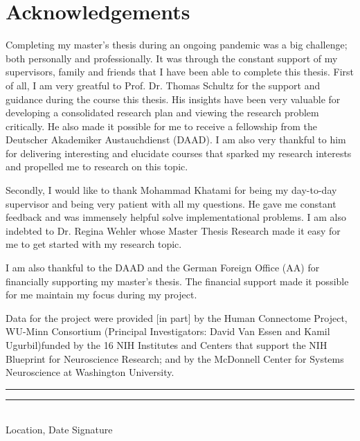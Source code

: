 
\chapter{Acknowledgements}
\thispagestyle{empty}
\noindent%
Completing my master's thesis during an ongoing pandemic was a big challenge; both personally and professionally. It was through the constant support of my supervisors, family and friends that I have been able to complete this thesis. 
First of all, I am very greatful to Prof. Dr. Thomas Schultz for the support and guidance during the course this thesis. His insights have been very valuable for developing a consolidated research plan and viewing the research problem critically. He also made it possible for me to receive a fellowship from the Deutscher Akademiker Austauchdienst (DAAD). I am also very thankful to him for delivering interesting and elucidate courses that sparked my research interests and propelled me to research on this topic.

Secondly, I would like to thank Mohammad Khatami for being my day-to-day supervisor and being very patient with all my questions. He gave me constant feedback and was immensely helpful solve implementational problems. I am also indebted to Dr. Regina Wehler whose Master Thesis Research made it easy for me to get started with my research topic. 

I am also thankful to the DAAD and the German Foreign Office (AA) for financially supporting my master's thesis. The financial support made it possible for me maintain my focus during my project.

Data for the project were provided [in part] by the Human Connectome Project, WU-Minn Consortium (Principal Investigators: David Van Essen and Kamil Ugurbil)funded by the 16 NIH Institutes and Centers that support the NIH Blueprint for Neuroscience Research; and by the McDonnell Center for Systems Neuroscience at Washington University. 
\vfill
\noindent%
\rule[1em]{8em}{0.5pt}  \hfill \rule[1em]{8em}{0.5pt}\\ %
Location, Date \hfill Signature\\
